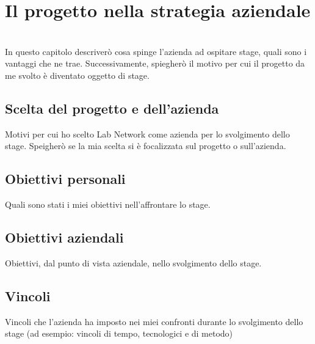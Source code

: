 
\chapter{Il progetto nella strategia aziendale}
\label{cap:processi-metodologie}

\\

In questo capitolo descriverò cosa spinge l'azienda ad ospitare stage, quali sono i vantaggi che ne trae.
Successivamente, spiegherò il motivo per cui il progetto da me svolto è diventato oggetto di stage.
\section{Scelta del progetto e dell'azienda}
Motivi per cui ho scelto Lab Network come azienda per lo svolgimento dello stage.
Speigherò se la mia scelta si è focalizzata sul progetto o sull'azienda.

\section{Obiettivi personali}
Quali sono stati i miei obiettivi nell'affrontare lo stage.

\section{Obiettivi aziendali}
Obiettivi, dal punto di vista aziendale, nello svolgimento dello stage.

\section{Vincoli}
Vincoli che l'azienda ha imposto nei miei confronti durante lo svolgimento dello stage (ad esempio: vincoli di tempo, tecnologici e di metodo)
